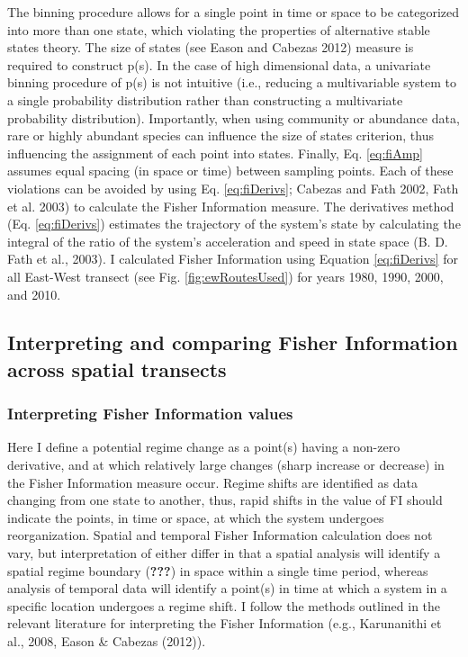 \documentclass[12pt,twoside,openany]{reedthesis}
\begin{document}
The binning procedure allows for a single point in time or space to be
categorized into more than one state, which violating the properties of
alternative stable states theory. The size of states (see Eason and
Cabezas 2012) measure is required to construct p(s). In the case of high
dimensional data, a univariate binning procedure of p(s) is not
intuitive (i.e., reducing a multivariable system to a single probability
distribution rather than constructing a multivariate probability
distribution). Importantly, when using community or abundance data, rare
or highly abundant species can influence the size of states criterion,
thus influencing the assignment of each point into states. Finally, Eq.
\eqref{eq:fiAmp} assumes equal spacing (in space or time) between sampling
points. Each of these violations can be avoided by using Eq.
\eqref{eq:fiDerivs}; Cabezas and Fath 2002, Fath et al. 2003) to calculate
the Fisher Information measure. The derivatives method (Eq.
\eqref{eq:fiDerivs}) estimates the trajectory of the system's state by
calculating the integral of the ratio of the system's acceleration and
speed in state space (B. D. Fath et al., 2003). I calculated Fisher
Information using Equation \eqref{eq:fiDerivs} for all East-West transect
(see Fig. \ref{fig:ewRoutesUsed}) for years 1980, 1990, 2000, and 2010.

\subsection{Interpreting and comparing Fisher Information across spatial
transects}\label{interpreting-and-comparing-fisher-information-across-spatial-transects}

\subsubsection{Interpreting Fisher Information
values}\label{interpreting-fisher-information-values}

Here I define a potential regime change as a point(s) having a non-zero
derivative, and at which relatively large changes (sharp increase or
decrease) in the Fisher Information measure occur. Regime shifts are
identified as data changing from one state to another, thus, rapid
shifts in the value of FI should indicate the points, in time or space,
at which the system undergoes reorganization. Spatial and temporal
Fisher Information calculation does not vary, but interpretation of
either differ in that a spatial analysis will identify a spatial regime
boundary ({\textbf{???}}) in space within a single time period, whereas
analysis of temporal data will identify a point(s) in time at which a
system in a specific location undergoes a regime shift. I follow the
methods outlined in the relevant literature for interpreting the Fisher
Information (e.g., Karunanithi et al., 2008, Eason \& Cabezas (2012)).
\end{document}
